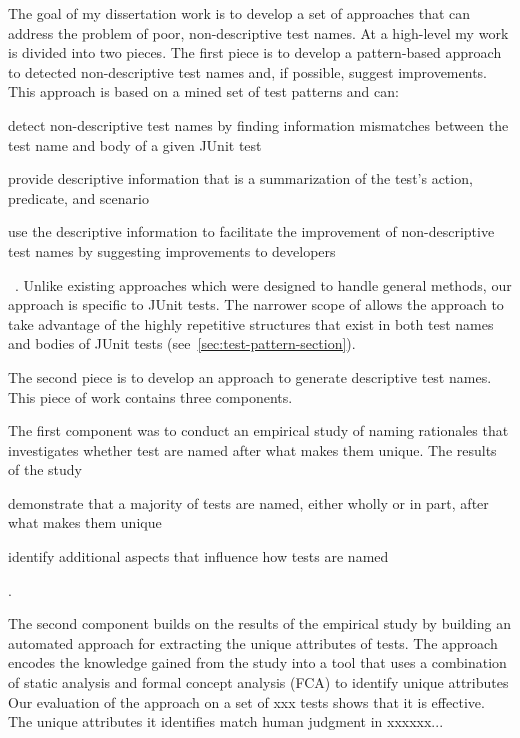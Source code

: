 The goal of my dissertation work is to develop a set of approaches that can address the problem of poor, non-descriptive test names.
%
At a high-level my work is divided into two pieces.
%
The first piece is to develop a pattern-based approach to detected non-descriptive test names and, if possible, suggest improvements.
%
This approach is based on a mined set of test patterns and can:
%
\begin{enumerate*}
\item detect non-descriptive test names by finding information mismatches between the test name and body of a given JUnit test
\item provide descriptive information that is a summarization of the test's action, predicate, and scenario
\item use the descriptive information to facilitate the improvement of non-descriptive test names by suggesting improvements to developers
\end{enumerate*}~\cite{wu2020pattern}.
%
Unlike existing approaches which were designed to handle general methods, our approach is specific to JUnit tests.
%
The narrower scope of allows the approach to take advantage of the highly repetitive structures that exist in both test names and bodies of JUnit tests (see~\cref{sec:test-pattern-section}).
%


The second piece is to develop an approach to generate descriptive test names.
% 
This piece of work contains three components.


The first component was to conduct an empirical study of naming rationales that investigates whether test are named after what makes them unique.
%
The results of the study
\begin{enumerate*}
\item demonstrate that a majority of tests are named, either wholly or in part, after what makes them unique
\item identify additional aspects that influence how tests are named
\end{enumerate*}.


The second component builds on the results of the empirical study by building an automated approach for extracting the unique attributes of tests.
% 
The approach encodes the knowledge gained from the study into a tool that uses a combination of static analysis and formal concept analysis (FCA) to identify unique attributes 
%
Our evaluation of the approach on a set of xxx tests shows that it is effective.
%
The unique attributes it identifies match human judgment in xxxxxx...


